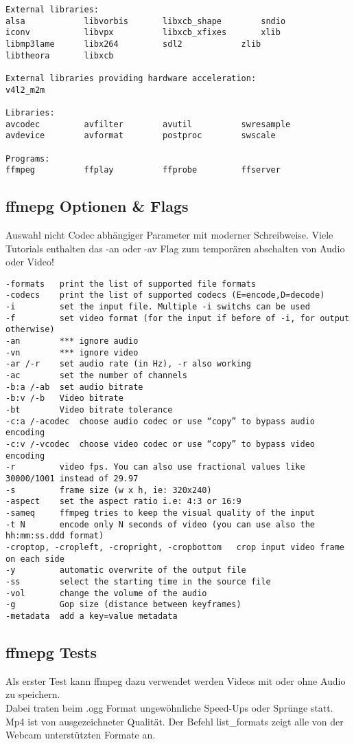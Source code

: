 \begin{verbatim}
External libraries:
alsa			libvorbis		libxcb_shape		sndio
iconv			libvpx			libxcb_xfixes		xlib
libmp3lame		libx264			sdl2			zlib
libtheora		libxcb

External libraries providing hardware acceleration:
v4l2_m2m

Libraries:
avcodec			avfilter		avutil			swresample
avdevice		avformat		postproc		swscale

Programs:
ffmpeg			ffplay			ffprobe			ffserver
\end{verbatim}

\subsection{ffmepg Optionen \& Flags}
Auswahl nicht Codec abhängiger Parameter mit moderner Schreibweise. Viele Tutorials enthalten das -an oder -av Flag zum temporären abschalten von Audio oder Video!
\begin{verbatim}
-formats   print the list of supported file formats
-codecs    print the list of supported codecs (E=encode,D=decode)
-i         set the input file. Multiple -i switchs can be used
-f         set video format (for the input if before of -i, for output otherwise)
-an        *** ignore audio
-vn        *** ignore video
-ar /-r    set audio rate (in Hz), -r also working
-ac        set the number of channels
-b:a /-ab  set audio bitrate
-b:v /-b   Video bitrate
-bt        Video bitrate tolerance
-c:a /-acodec  choose audio codec or use “copy” to bypass audio encoding
-c:v /-vcodec  choose video codec or use “copy” to bypass video encoding
-r         video fps. You can also use fractional values like 30000/1001 instead of 29.97
-s         frame size (w x h, ie: 320x240)
-aspect    set the aspect ratio i.e: 4:3 or 16:9
-sameq     ffmpeg tries to keep the visual quality of the input
-t N       encode only N seconds of video (you can use also the hh:mm:ss.ddd format)
-croptop, -cropleft, -cropright, -cropbottom   crop input video frame on each side
-y         automatic overwrite of the output file
-ss        select the starting time in the source file
-vol       change the volume of the audio
-g         Gop size (distance between keyframes)
-metadata  add a key=value metadata
\end{verbatim}

\subsection{ffmepg Tests}
Als erster Test kann ffmpeg dazu verwendet werden Videos mit oder ohne Audio zu speichern.\\
Dabei traten beim .ogg Format ungewöhnliche Speed-Ups oder Sprünge statt. Mp4 ist von 
ausgezeichneter Qualität. Der Befehl list\_formats zeigt alle von der Webcam unterstützten 
Formate an.\\


